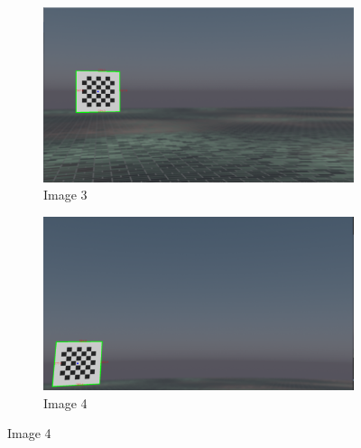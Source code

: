 \begin{figure}[h!]
    \vspace{1cm}
    
    \begin{subfigure}[b]{0.45\textwidth}
        \centering
        \includegraphics[width=\textwidth]{Images/02stateart/edge_detection_3.png}
        \caption{Image 3}
    \end{subfigure}
    \hfill
    \begin{subfigure}[b]{0.45\textwidth}
        \centering
        \includegraphics[width=\textwidth]{Images/02stateart/edge_detection_4.png}
        \caption{Image 4}
    \end{subfigure}
    
    \vspace{1cm}
    

\end{figure}
